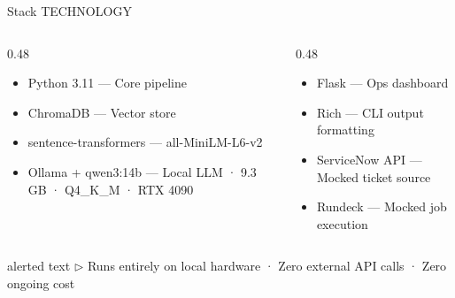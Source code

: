 \documentclass[aspectratio=169,10pt]{beamer}
\newcommand{\slidecat}[1]{{\color{cdim}\ttfamily\scriptsize\MakeUppercase{#1}}}
\begin{document}
\begin{frame}{Stack}
  \slidecat{Technology}
  \vspace{0.3cm}
  \begin{columns}[T]
    \begin{column}{0.48\textwidth}
      \begin{itemize}\itemsep4pt
        \item {\color{cteal}\ttfamily\small Python 3.11} --- Core pipeline
        \item {\color{cteal}\ttfamily\small ChromaDB} --- Vector store
        \item {\color{cteal}\ttfamily\small sentence-transformers} --- all-MiniLM-L6-v2
        \item {\color{cteal}\ttfamily\small Ollama + qwen3:14b} --- Local LLM · 9.3 GB · Q4\_K\_M · RTX 4090
      \end{itemize}
    \end{column}
    \begin{column}{0.48\textwidth}
      \begin{itemize}\itemsep4pt
        \item {\color{cteal}\ttfamily\small Flask} --- Ops dashboard
        \item {\color{cteal}\ttfamily\small Rich} --- CLI output formatting
        \item {\color{cteal}\ttfamily\small ServiceNow API} --- Mocked ticket source
        \item {\color{cteal}\ttfamily\small Rundeck} --- Mocked job execution
      \end{itemize}
    \end{column}
  \end{columns}
  \vspace{0.4cm}
  \begin{beamercolorbox}[sep=6pt,rounded=true,wd=\textwidth]{alerted text}
    {\color{cgreen}\ttfamily\small $\triangleright$ Runs entirely on local hardware · Zero external API calls · Zero ongoing cost}
  \end{beamercolorbox}
\end{frame}
\end{document}
